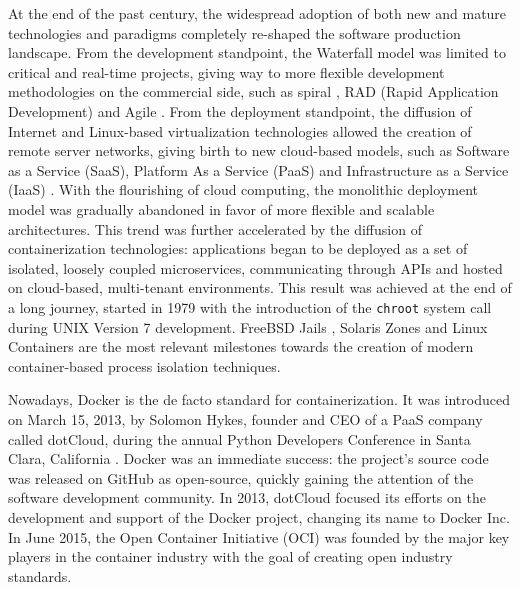\newpage
At the end of the past century, the widespread adoption of both new and mature technologies and paradigms completely re-shaped the software production landscape. From the development standpoint, the Waterfall model was limited to critical and real-time projects, giving way to more flexible development methodologies on the commercial side, such as spiral \cite{boehm1988spiral}, RAD (Rapid Application Development) \cite{martinRapidApplicationDevelopment1991} and Agile \cite{ManifestoAgileSoftware}. 
From the deployment standpoint, the diffusion of Internet and Linux-based virtualization technologies allowed the creation of remote server networks, giving birth to new cloud-based models, such as Software as a Service (SaaS), Platform As a Service (PaaS) and Infrastructure as a Service (IaaS) \cite{manvi2014resource}. With the flourishing of cloud computing, the monolithic deployment model was gradually abandoned in favor of more flexible and scalable architectures. This trend was further accelerated by the diffusion of containerization technologies:  applications began to be deployed as a set of isolated, loosely coupled microservices, communicating through APIs and hosted on cloud-based, multi-tenant environments.
This result was achieved at the end of a long journey, started in 1979 with the introduction of the \texttt{chroot} system call \cite{kerriskLinuxProgrammingInterface2010} during UNIX Version 7 development. FreeBSD Jails \cite{kampJailsConfiningOmnipotent}, Solaris Zones \cite{priceSolarisZonesOperating2004} and Linux Containers \cite{LinuxContainers} are the most relevant milestones towards the creation of modern container-based process isolation techniques.

Nowadays, Docker is the de facto standard for containerization. It was introduced on March 15, 2013, by Solomon Hykes, founder and CEO of a PaaS company called dotCloud, during the annual Python Developers Conference in Santa Clara, California \cite{hykesLightningTalkFuture2013}. Docker was an immediate success: the project's source code was released on GitHub as open-source, quickly gaining the attention of the software development community.
In 2013, dotCloud focused its efforts on the development and support of the Docker project, changing its name to Docker Inc. In June 2015, the Open Container Initiative (OCI) \cite{OpenContainerInitiative} was founded by the major key players in the container industry with the goal of creating open industry standards.

